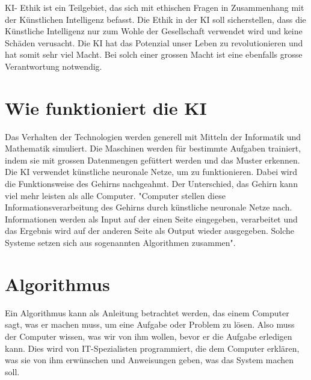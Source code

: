 \documentclass{report}
\begin{document}
KI- Ethik ist ein Teilgebiet, das sich mit ethischen Fragen in Zusammenhang mit der Künstlichen Intelligenz befasst. Die Ethik in der KI soll sicherstellen, dass die Künstliche Intelligenz nur zum Wohle der Gesellschaft verwendet wird und keine Schäden verusacht. Die KI hat das Potenzial unser Leben zu revolutionieren und hat somit sehr viel Macht. Bei solch einer grossen Macht ist eine ebenfalls grosse Verantwortung notwendig.


\section{Wie funktioniert die KI}
Das Verhalten der Technologien werden generell mit Mitteln der Informatik und Mathematik simuliert. Die Maschinen werden für bestimmte Aufgaben trainiert, indem sie mit grossen Datenmengen gefüttert werden und das Muster erkennen. Die KI verwendet künstliche neuronale Netze, um zu funktionieren. Dabei wird die Funktionsweise des Gehirns nachgeahmt. Der Unterschied, das Gehirn kann viel mehr leisten als alle Computer. "Computer stellen diese Informationsverarbeitung  des Gehirns durch künstliche neuronale Netze nach. Informationen werden als Input auf der einen Seite eingegeben, verarbeitet und das Ergebnis wird auf der anderen Seite als Output wieder ausgegeben. Solche Systeme setzen sich aus sogenannten Algorithmen zusammen"\citep{ai-genius-community}.

\section{Algorithmus}
Ein Algorithmus kann als Anleitung betrachtet werden, das einem Computer sagt, was er machen muss, um eine Aufgabe oder Problem zu lösen. Also muss der Computer wissen, was wir von ihm wollen, bevor er die Aufgabe erledigen kann. Dies wird von IT-Spezialisten programmiert, die dem Computer erklären, was sie von ihm erwünschen und Anweisungen geben, was das System machen soll.

\printbibliography
\end{document}
